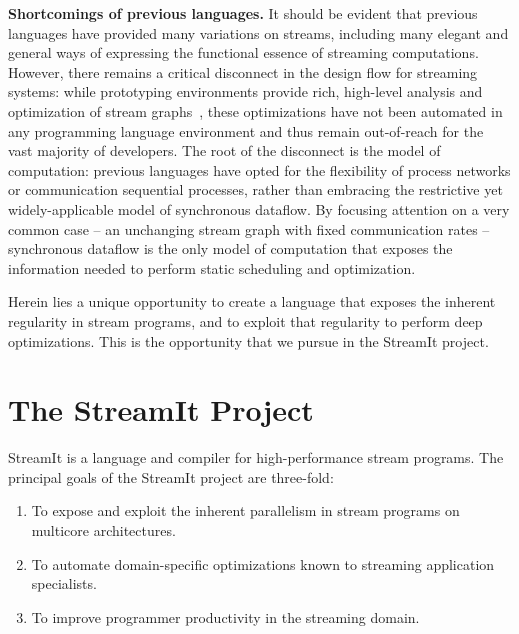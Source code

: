 {\bf Shortcomings of previous languages.}  It should be evident that
previous languages have provided many variations on streams, including
many elegant and general ways of expressing the functional essence of
streaming computations.  However, there remains a critical disconnect
in the design flow for streaming systems: while prototyping
environments provide rich, high-level analysis and optimization of
stream
graphs~\cite{bhattacharyya_optimal_1995,bhattacharyya_software_1996,bhattacharyya_self-timed_1996,ad_data_1997,zitzler_multidimensional_2000,murthy_shared_2001,govindarajan_minimizing_2002,murthy_buffer_2004,geilen_minimising_2005,stuijk_exploring_2006},
these optimizations have not been automated in any programming
language environment and thus remain out-of-reach for the vast
majority of developers.  The root of the disconnect is the model of
computation: previous languages have opted for the flexibility of
process networks or communication sequential processes, rather than
embracing the restrictive yet widely-applicable model of synchronous
dataflow.  By focusing attention on a very common case -- an
unchanging stream graph with fixed communication rates -- synchronous
dataflow is the only model of computation that exposes the information
needed to perform static scheduling and optimization.

Herein lies a unique opportunity to create a language that exposes the
inherent regularity in stream programs, and to exploit that regularity
to perform deep optimizations.  This is the opportunity that we pursue
in the StreamIt project.


\section{The StreamIt Project}

StreamIt is a language and compiler for high-performance stream
programs.  The principal goals of the StreamIt project are three-fold:

\begin{enumerate}

\item To expose and exploit the inherent parallelism in stream
  programs on multicore architectures.

\item To automate domain-specific optimizations known to streaming
  application specialists.

\item To improve programmer productivity in the streaming domain.

\end{enumerate}

